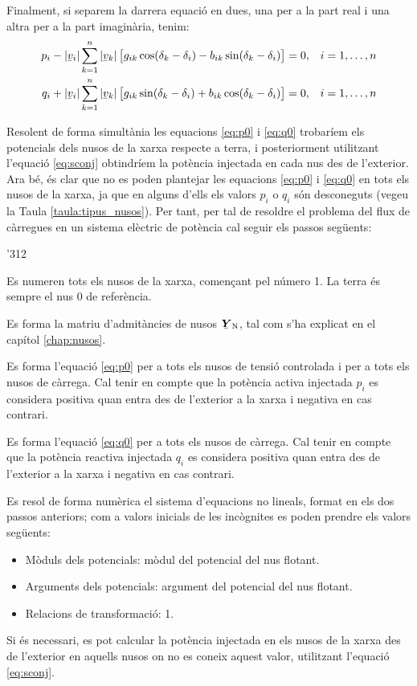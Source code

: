 Finalment, si separem la darrera equació en dues, una per a  la part real i  una altra per
a la part imaginària, tenim:
\begin{align}
    p_i - |\cmplx{v}_i| \sum^n_{k=1}  |\cmplx{v}_k|\, \bigl[ g_{ik} \cos(\delta_k - \delta_i) -
     b_{ik} \sin(\delta_k - \delta_i) \bigr] &= 0,  & i&=1,\ldots,n\label{eq:p0} \\
    q_i + |\cmplx{v}_i| \sum^n_{k=1}  |\cmplx{v}_k| \,\bigl[ g_{ik} \sin(\delta_k - \delta_i) +
      b_{ik} \cos(\delta_k - \delta_i) \bigr] &= 0, & i&=1,\ldots,n\label{eq:q0}
\end{align}

Resolent de forma simultània les equacions \eqref{eq:p0} i
\eqref{eq:q0} trobaríem els potencials dels nusos de la xarxa
respecte a  terra, i posteriorment utilitzant l'equació
\eqref{eq:sconj} obtindríem la potència injectada en cada nus des
de l'exterior. Ara bé, és clar que no es poden plantejar les
equacions \eqref{eq:p0} i \eqref{eq:q0} en tots els nusos de la
xarxa, ja que en alguns d'ells els valors $p_i$ o $q_i$ són
desconeguts (vegeu la Taula \vref{taula:tipus_nusos}). Per tant, per
tal de resoldre el problema del flux de càrregues en un sistema
elèctric de potència cal seguir els passos següents:
\begin{dingautolist}{'312}
    \item Es numeren tots els nusos de la xarxa, començant pel número 1. La terra és sempre el nus 0 de referència.
   \item Es forma la matriu d'admitàncies de nusos $\mcmplx{Y}\ped{N}$, tal com s'ha
   explicat en el capítol \ref{chap:nusos}.
   \item Es forma l'equació \eqref{eq:p0} per a tots els nusos de tensió controlada i per
   a tots els nusos de càrrega. Cal tenir en compte que la potència activa  injectada $p_i$ es considera
   positiva quan entra des de l'exterior a la xarxa i negativa en cas contrari.
   \item Es forma l'equació \eqref{eq:q0} per a tots els nusos de càrrega. Cal tenir en compte
   que la potència reactiva injectada $q_i$  es considera positiva quan entra des de l'exterior a la xarxa i negativa en cas contrari.
   \item Es resol de forma numèrica el sistema d'equacions no lineals, format en els dos
   passos anteriors; com a valors inicials de les incògnites es poden prendre els valors
   següents:
   \begin{itemize}
    \item Mòduls dels potencials: mòdul del potencial del nus flotant.
    \item Arguments dels potencials: argument del potencial del nus flotant.
    \item Relacions de transformació: 1.
   \end{itemize}
   \item Si és necessari,  es pot calcular la potència injectada en els nusos de la xarxa
   des de l'exterior en aquells nusos on no es
   coneix aquest valor, utilitzant    l'equació \eqref{eq:sconj}.
\end{dingautolist}


